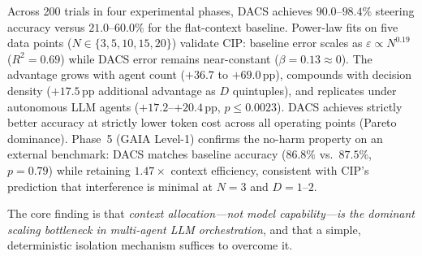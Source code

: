 \documentclass{article}
\begin{document}
Across 200 trials in four experimental phases, DACS achieves
$90.0$--$98.4\%$ steering accuracy versus $21.0$--$60.0\%$ for the
flat-context baseline.
Power-law fits on five data points ($N\in\{3,5,10,15,20\}$) validate CIP:
baseline error scales as $\varepsilon \propto N^{0.19}$ ($R^2 = 0.69$)
while DACS error remains near-constant ($\beta = 0.13 \approx 0$).
The advantage grows with agent count ($+36.7$ to $+69.0$\,pp),
compounds with decision density ($+17.5$\,pp additional advantage as
$D$ quintuples), and replicates under autonomous LLM agents
($+17.2$--$+20.4$\,pp, $p \leq 0.0023$).
DACS achieves strictly better accuracy at strictly lower token cost
across all operating points (Pareto dominance).
Phase~5 (GAIA Level-1) confirms the no-harm property on an external
benchmark: DACS matches baseline accuracy ($86.8\%$ vs.\ $87.5\%$,
$p{=}0.79$) while retaining $1.47\times$ context efficiency,
consistent with CIP's prediction that interference is minimal
at $N{=}3$ and $D{=}1$--$2$.

The core finding is that \emph{context allocation---not model
capability---is the dominant scaling bottleneck in multi-agent LLM
orchestration}, and that a simple, deterministic isolation mechanism
suffices to overcome it.



\end{document}
